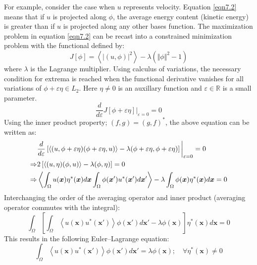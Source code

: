 \documentclass[10pt,letterpaper, onecolumn]{article}
\begin{document}
For example, consider the case when $u$ represents velocity. Equation \eqref{eqn7.2} means that if $u$ is projected along $\phi$, the average energy content (kinetic energy) is greater than if $u$ is projected along any other bases function. The maximization problem in equation \eqref{eqn7.2} can be recast into a constrained minimization problem with the functional defined by:
%
\begin{equation}
J[\phi] = \left \langle \vert (u , \phi) \vert^2 \right \rangle - \lambda \left (  \Vert \phi \Vert^2  -1 \right) 
\end{equation}
%
where $\lambda$ is the Lagrange multiplier. Using calculus of variations, the necessary condition for extrema is reached when the functional derivative vanishes for all variations of $\phi + \varepsilon \eta \in L_2$. Here $\eta \neq 0$ is an auxillary function and 
$\varepsilon \in \mathbb{R}$ is a small parameter.
%
\begin{equation}
\frac{d}{d\varepsilon} J[\phi + \varepsilon \eta] \bigg \vert_{\varepsilon = 0} = 0
\end{equation}
%
Using the inner product property; $(f,g) = (g,f)^*$, the above equation can be written as:
%
\begin{align}
&\frac{d}{d\varepsilon} \left [  \left \langle  (u , \phi + \varepsilon \eta) (\phi + \varepsilon \eta , u)   \right \rangle
- \lambda (\phi + \varepsilon \eta,\phi + \varepsilon \eta)  \right]    \bigg \vert_{\varepsilon = 0} = 0 \notag \\
\Rightarrow &2  \left [     \left \langle  (u,\eta)(\phi,u)    \right \rangle - \lambda (\phi,\eta)  \right] = 0 \notag \\
\Rightarrow &\left \langle    \int_{\Omega} u(\bm{x}) \eta^*(\bm{x}) d\bm{x}    \int_{\Omega}  \phi(\bm{x}') u^*(\bm{x}')  d\bm{x}' \right \rangle -
\lambda \int_{\Omega} \phi(\bm{x}) \eta^*(\bm{x}) d\bm{x} = 0
\end{align}
%
Interchanging the order of the averaging operator and inner product (averaging operator commutes with the integral):
%
\begin{equation}
\int_{\Omega}  \left [  \int_{\Omega}  \left \langle u(\bm{x}) u^*(\bm{x}') \right \rangle \phi(\bm{x}') d\bm{x}' - \lambda \phi(\bm{x})   \right ]  \eta^*(\bm{x}) d\bm{x}  = 0
\end{equation}
%
This results in the following Euler--Lagrange equation: 
%
\begin{equation}
\int_{\Omega}  \left \langle u(\bm{x}) u^*(\bm{x}') \right \rangle \phi(\bm{x}') d\bm{x}' = \lambda \phi(\bm{x});  \quad \forall \eta^*(\bm{x}) \neq 0
\label{eqn7.9}
\end{equation}
\end{document}
